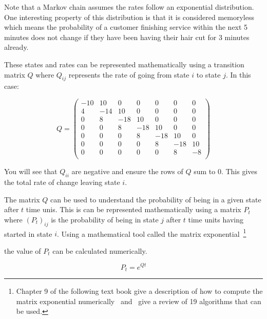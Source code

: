 Note that a Markov chain assumes the rates follow an exponential distribution.
One interesting property of this distribution is that it is considered
memoryless which means the probability of a customer finishing service
within the next 5 minutes does not change if they have been
having their hair cut for 3 minutes already.

These states and rates can be represented mathematically using a transition
matrix \(Q\) where \(Q_{ij}\) represents the rate of going from state \(i\) to
state \(j\). In this case:

\begin{equation}
Q =
\begin{pmatrix}
-10 &  10 &   0 &   0 &   0 &   0 &   0\\
  4 & -14 &  10 &   0 &   0 &   0 &   0\\
  0 &   8 & -18 &  10 &   0 &   0 &   0\\
  0 &   0 &   8 & -18 &  10 &   0 &   0\\
  0 &   0 &   0 &   8 & -18 &  10 &   0\\
  0 &   0 &   0 &   0 &   8 & -18 &  10\\
  0 &   0 &   0 &   0 &   0 &   8 &  -8\\
 \end{pmatrix}
 \label{eqn:barber_shop_transition_matrix}
\end{equation}

You will see that \(Q_{ii}\) are negative and ensure the rows of \(Q\) sum to 0.
This gives the total rate of change leaving state \(i\).

The matrix \(Q\) can be used to understand the probability of being in a given state after
\(t\) time unis. This is can be represented mathematically using a matrix
\(P_{t}\) where \((P_{t})_{ij}\) is the probability of being in state \(j\)
after \(t\) time units having started in state \(i\). Using a mathematical tool
called the matrix exponential~\footnote{

Chapter 9 of the following text book give a description of how to compute the
matrix exponential numerically~\autocite{van1996matrix}
and~\autocite{moler1978nineteen, moler2003nineteen} give a review of 19
algorithms that can be used.
}

the value of \(P_{t}\) can be calculated numerically.

\begin{equation}
    P_t = e^{Qt}
    \label{eqn:continuous_time_markov_process_matrix_exponential}
\end{equation}

